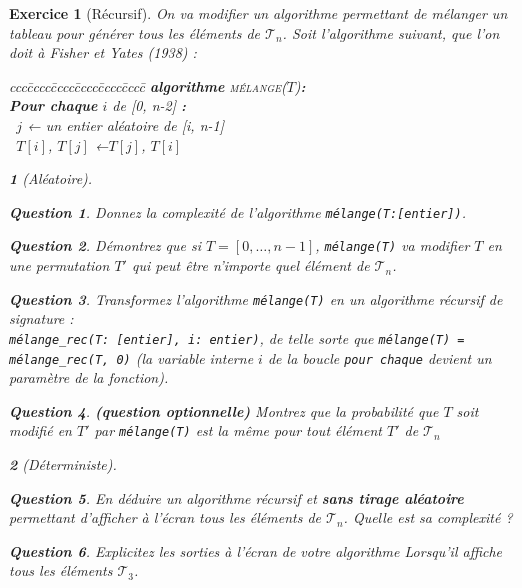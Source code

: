 \documentclass{article}
\theoremstyle{exostyle}
\newtheorem{exo}{Exercice}
\theoremstyle{partiestyle}
\newtheorem{partie}{}[exo]
\theoremstyle{questionstyle}
\newtheorem{questionpartie}{Question}[partie]
\begin{document}
\begin{exo}[Récursif]
    On va modifier un algorithme permettant de mélanger un tableau pour générer tous les éléments de $\mathcal{T}_n$. Soit l'algorithme suivant, que l'on doit à Fisher et Yates (1938) :
        \begin{tabbing}
            ccc\=cccc\=cccc\=cccc\=cccc\=cccc\=\kill
            \textbf{algorithme} \textsc{mélange}($T$){\bf :}\\
            \>\textbf{Pour chaque} $i$ de [0, n-2] {\bf :}\\
            \> \>\vline $\,$ $j$ ← un entier aléatoire de [i, n-1] \\
            \> \>\vline $\,$ $T[i]$, $T[j]$ ←$T[j]$, $T[i]$
        \end{tabbing}

    \begin{partie}[Aléatoire]
        \begin{questionpartie}
            Donnez la complexité de l'algorithme \verb|mélange(T:[entier])|.
        \end{questionpartie}
        \begin{questionpartie}
            Démontrez que si $T=[0, \dots, n-1]$, \verb|mélange(T)| va modifier $T$ en une permutation $T'$ qui peut être n'importe quel élément de $\mathcal{T}_n$.
        \end{questionpartie}
        \begin{questionpartie}
            Transformez l'algorithme \verb|mélange(T)| en un algorithme récursif de signature :\\ \verb|mélange_rec(T: [entier], i: entier)|, de telle sorte que \verb|mélange(T) = mélange_rec(T, 0)| (la variable interne $i$ de la boucle \verb|pour chaque| devient un paramètre de la fonction). 
        \end{questionpartie}
        \begin{questionpartie}
        {\em\bf (question optionnelle)} Montrez que la probabilité que $T$ soit modifié en $T'$ par \verb|mélange(T)| est la même pour tout élément $T'$ de $\mathcal{T}_n$
        \end{questionpartie}

        \end{partie}
        \begin{partie}[Déterministe]
        \begin{questionpartie}
            En déduire un algorithme récursif et {\bf sans tirage aléatoire} permettant d'afficher à l'écran tous les éléments de $\mathcal{T}_n$. Quelle est sa complexité ?
        \end{questionpartie}
        \begin{questionpartie}
            Explicitez les sorties à l'écran de votre algorithme Lorsqu'il affiche tous les éléments $\mathcal{T}_3$.
        \end{questionpartie}

    \end{partie}
\end{exo}
\end{document}

